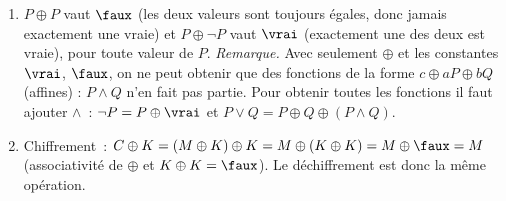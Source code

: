 \begin{enumerate}
        \textbf{\'Etape~c~: assemblage.} On part de $P\oplus Q\equiv(P\lor Q)\land\lnot(P\land Q)$
        (question~2) et on remplace \`a l'aide des \'etapes~a et~b~:
        \begin{itemize}
          \item $P\lor Q$ devient $\lnot P\Rightarrow Q$~;
          \item $\lnot(P\land Q)$ devient $\lnot\lnot(P\Rightarrow\lnot Q)$, c'est-\`a-dire $P\Rightarrow\lnot Q$~;
          \item le $\land$ central, appliqu\'e \`a $A=(\lnot P\Rightarrow Q)$ et $B=(P\Rightarrow\lnot Q)$,
                devient $\lnot(A\Rightarrow\lnot B)$ (\'etape~b).
        \end{itemize}
        D'o\`u
        \[P\oplus Q\ \equiv\ \lnot\bigl((\lnot P\Rightarrow Q)\Rightarrow\lnot(P\Rightarrow\lnot Q)\bigr),\]
        qui n'utilise que $\Rightarrow$ et $\lnot$.

        \textbf{V\'erification.} $\lnot P\Rightarrow Q$ est fausse seulement si $P=Q=\faux$~;
        $P\Rightarrow\lnot Q$ est fausse seulement si $P=Q=\vrai$.
        Pour $P\ne Q$, $A=B=\vrai$, donc $A\Rightarrow\lnot B$ est fausse et la formule est vraie~;
        pour $P=Q$, l'une des deux est fausse, $A\Rightarrow\lnot B$ est vraie et la formule est fausse.
        On retrouve la table de $P\oplus Q$.\checkmark

        \emph{Remarque.} Une formule plus courte existe~: $P\oplus Q\equiv\lnot(P\Leftrightarrow Q)$,
        et $\lnot\bigl((P\Rightarrow Q)\land(Q\Rightarrow P)\bigr)\equiv(P\Rightarrow Q)\Rightarrow\lnot(Q\Rightarrow P)$
        (\'etape~b), d'o\`u $P\oplus Q\equiv(P\Rightarrow Q)\Rightarrow\lnot(Q\Rightarrow P)$
        (v\'erifi\'e sur les $4$ lignes).
  \item $P\oplus P$ vaut $\faux$ (les deux valeurs sont toujours \'egales, donc jamais exactement une vraie)
        et $P\oplus\lnot P$ vaut $\vrai$ (exactement une des deux est vraie), pour toute valeur de $P$.\checkmark
        \emph{Remarque.} Avec seulement $\oplus$ et les constantes $\vrai$, $\faux$, on ne peut obtenir que
        des fonctions de la forme $c\oplus aP\oplus bQ$ (affines) : $P\land Q$ n'en fait pas partie.
        Pour obtenir toutes les fonctions il faut ajouter $\land$~:
        $\lnot P=P\oplus\vrai$ et $P\lor Q=P\oplus Q\oplus(P\land Q)$.
  \item Chiffrement~: $C\oplus K=(M\oplus K)\oplus K=M\oplus(K\oplus K)=M\oplus\faux=M$
        (associativit\'e de $\oplus$ et $K\oplus K=\faux$). Le d\'echiffrement est donc la m\^eme op\'eration.\checkmark
\end{enumerate}

